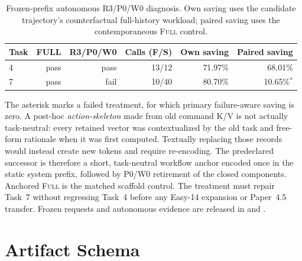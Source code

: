 \documentclass[11pt]{article}
\begin{document}
\begin{table}[H]
\centering
\scriptsize
\caption{Frozen-prefix autonomous R3/P0/W0 diagnosis.  Own saving uses the
candidate trajectory's counterfactual full-history workload; paired saving
uses the contemporaneous \textsc{Full} control.}
\label{tab:p0w0-autonomous}
\begin{tabular}{lrrrrr}
\toprule
Task & FULL & R3/P0/W0 & Calls (F/S) & Own saving & Paired saving \\
\midrule
4 & pass & pass & 13/12 & 71.97\% & 68.01\% \\
7 & pass & fail & 10/40 & 80.70\% & 10.65\%$^{*}$ \\
\bottomrule
\end{tabular}
\end{table}

The asterisk marks a failed treatment, for which primary failure-aware saving
is zero.  A post-hoc \emph{action-skeleton} made from old command K/V is not
actually task-neutral: every retained vector was contextualized by the old
task and free-form rationale when it was first computed.  Textually replacing
those records would instead create new tokens and require re-encoding.  The
predeclared successor is therefore a short, task-neutral workflow anchor
encoded once in the static system prefix, followed by P0/W0 retirement of the
closed components.  Anchored \textsc{Full} is the matched scaffold control.
The treatment must repair Task~7 without regressing Task~4 before any Easy-14
expansion or Paper~4.5 transfer.  Frozen requests and autonomous evidence are released in
 and
.

\section{Artifact Schema}
\end{document}
